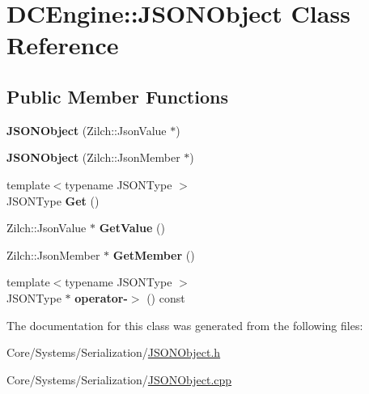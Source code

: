 \hypertarget{classDCEngine_1_1JSONObject}{\section{D\-C\-Engine\-:\-:J\-S\-O\-N\-Object Class Reference}
\label{classDCEngine_1_1JSONObject}
}
\subsection*{Public Member Functions}
\begin{DoxyCompactItemize}
\item 
\hypertarget{classDCEngine_1_1JSONObject_a66921d89dd58ad19005b26763986d54d}{{\bfseries J\-S\-O\-N\-Object} (Zilch\-::\-Json\-Value $\ast$)}\label{classDCEngine_1_1JSONObject_a66921d89dd58ad19005b26763986d54d}

\item 
\hypertarget{classDCEngine_1_1JSONObject_ab63d39091de7eab7cecfffc85495223b}{{\bfseries J\-S\-O\-N\-Object} (Zilch\-::\-Json\-Member $\ast$)}\label{classDCEngine_1_1JSONObject_ab63d39091de7eab7cecfffc85495223b}

\item 
\hypertarget{classDCEngine_1_1JSONObject_aadda99504f28e4d830167235a323177a}{{\footnotesize template$<$typename J\-S\-O\-N\-Type $>$ }\\J\-S\-O\-N\-Type {\bfseries Get} ()}\label{classDCEngine_1_1JSONObject_aadda99504f28e4d830167235a323177a}

\item 
\hypertarget{classDCEngine_1_1JSONObject_a20b073fa20d64b5c17e203e21c1e956c}{Zilch\-::\-Json\-Value $\ast$ {\bfseries Get\-Value} ()}\label{classDCEngine_1_1JSONObject_a20b073fa20d64b5c17e203e21c1e956c}

\item 
\hypertarget{classDCEngine_1_1JSONObject_a9df02e594f947142cdd14f4d68bc5ddd}{Zilch\-::\-Json\-Member $\ast$ {\bfseries Get\-Member} ()}\label{classDCEngine_1_1JSONObject_a9df02e594f947142cdd14f4d68bc5ddd}

\item 
\hypertarget{classDCEngine_1_1JSONObject_ac9ee97ca907ca4554a60e83bf9e19608}{{\footnotesize template$<$typename J\-S\-O\-N\-Type $>$ }\\J\-S\-O\-N\-Type $\ast$ {\bfseries operator-\/$>$} () const }\label{classDCEngine_1_1JSONObject_ac9ee97ca907ca4554a60e83bf9e19608}

\end{DoxyCompactItemize}


The documentation for this class was generated from the following files\-:\begin{DoxyCompactItemize}
\item 
Core/\-Systems/\-Serialization/\hyperlink{JSONObject_8h}{J\-S\-O\-N\-Object.\-h}\item 
Core/\-Systems/\-Serialization/\hyperlink{JSONObject_8cpp}{J\-S\-O\-N\-Object.\-cpp}\end{DoxyCompactItemize}
